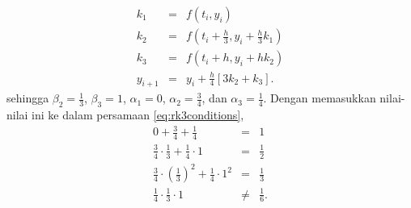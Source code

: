\begin{description}
\begin{eqnarray*}
k_{1} & = & f(t_{i},y_{i})\\
k_{2} & = & f\left(t_{i}+\frac{h}{3},y_{i}+\frac{h}{3}k_{1}\right)\\
k_{3} & = & f\left(t_{i}+h,y_{i}+hk_{2}\right)\\
y_{i+1} & = & y_{i}+\frac{h}{4}\left[3k_{2}+k_{3}\right].
\end{eqnarray*}
sehingga $\beta_{2}=\frac{1}{3}$, $\beta_{3}=1$, $\alpha_{1}=0$,
$\alpha_{2}=\frac{3}{4}$, dan $\alpha_{3}=\frac{1}{4}$. Dengan memasukkan
nilai-nilai ini ke dalam persamaan \ref{eq:rk3conditions},
\begin{eqnarray*}
0+\frac{3}{4}+\frac{1}{4} & = & 1\\
\frac{3}{4}\cdot\frac{1}{3}+\frac{1}{4}\cdot1 & = & \frac{1}{2}\\
\frac{3}{4}\cdot\left(\frac{1}{3}\right)^{2}+\frac{1}{4}\cdot1^{2} & = & \frac{1}{3}\\
\frac{1}{4}\cdot\frac{1}{3}\cdot1 & \neq & \frac{1}{6}.
\end{eqnarray*}


\end{description}

